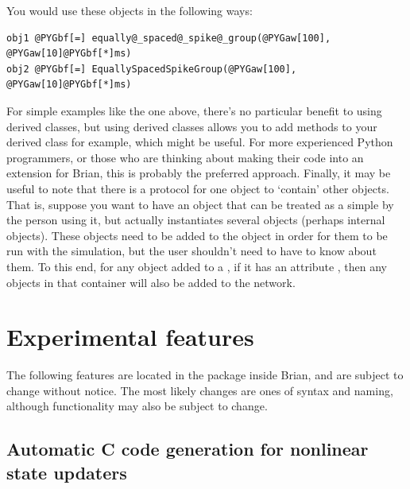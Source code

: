 \documentclass[letterpaper,10pt,english]{manual}
\begin{document}
You would use these objects in the following ways:

\begin{Verbatim}[commandchars=@\[\]]
obj1 @PYGbf[=] equally@_spaced@_spike@_group(@PYGaw[100], @PYGaw[10]@PYGbf[*]ms)
obj2 @PYGbf[=] EquallySpacedSpikeGroup(@PYGaw[100], @PYGaw[10]@PYGbf[*]ms)
\end{Verbatim}

For simple examples like the one above, there's no particular benefit to
using derived classes, but using derived classes allows you to add
methods to your derived class for example, which might be useful. For
more experienced Python programmers, or those who are thinking about
making their code into an extension for Brian, this is probably the
preferred approach.
Finally, it may be useful to note that there is a protocol for one object
to `contain' other objects. That is, suppose you want to have an object
that can be treated as a simple \hyperlink{brian.NeuronGroup}{} by the person using it,
but actually instantiates several objects (perhaps internal \hyperlink{brian.Connection}{}
objects). These objects need to be added to the \hyperlink{brian.Network}{} object
in order for them to be run with the simulation, but the user shouldn't need
to have to know about them. To this end, for any object added to a
\hyperlink{brian.Network}{}, if it has an attribute , then any
objects in that container will also be added to the network.

\resetcurrentobjects
\hypertarget{--doc-experimental}{}

\chapter{Experimental features}

The following features are located in the  package inside Brian, and are subject to change
without notice. The most likely changes are ones of syntax and naming, although functionality may also
be subject to change.

\resetcurrentobjects
\hypertarget{--doc-experimental-ccodegen}{}

\hypertarget{ccodegen}{}\section{Automatic C code generation for nonlinear state updaters}
\end{document}
